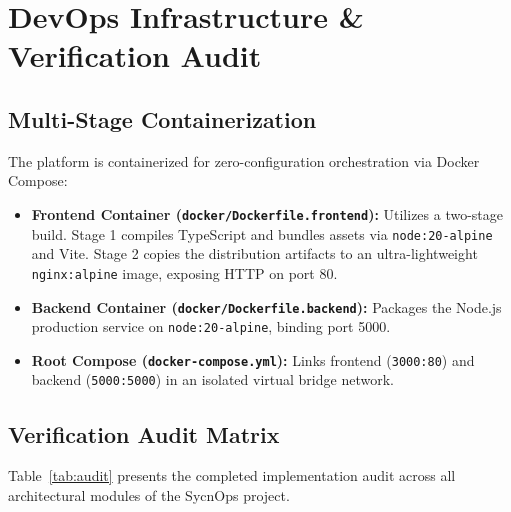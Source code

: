 \documentclass[conference]{IEEEtran}
\begin{document}
\section{DevOps Infrastructure \& Verification Audit}

\subsection{Multi-Stage Containerization}
The platform is containerized for zero-configuration orchestration via Docker Compose:
\begin{itemize}
    \item \textbf{Frontend Container (\texttt{docker/Dockerfile.frontend}):} Utilizes a two-stage build. Stage 1 compiles TypeScript and bundles assets via \texttt{node:20-alpine} and Vite. Stage 2 copies the distribution artifacts to an ultra-lightweight \texttt{nginx:alpine} image, exposing HTTP on port 80.
    \item \textbf{Backend Container (\texttt{docker/Dockerfile.backend}):} Packages the Node.js production service on \texttt{node:20-alpine}, binding port 5000.
    \item \textbf{Root Compose (\texttt{docker-compose.yml}):} Links frontend (\texttt{3000:80}) and backend (\texttt{5000:5000}) in an isolated virtual bridge network.
\end{itemize}

\subsection{Verification Audit Matrix}
Table~\ref{tab:audit} presents the completed implementation audit across all architectural modules of the SycnOps project.
\end{document}

